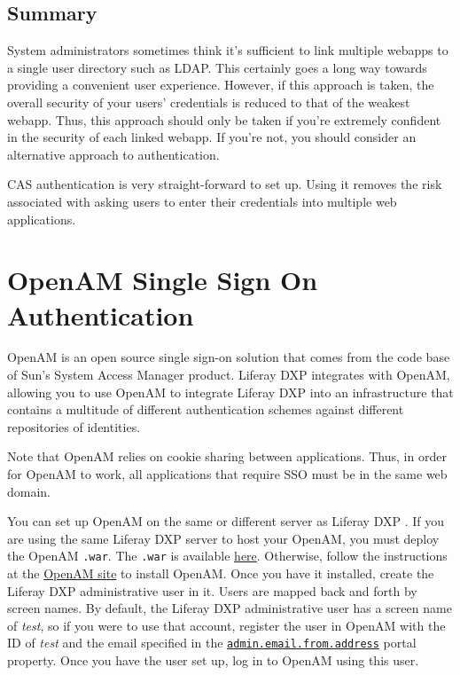 \subsection{Summary}\label{summary-3}

System administrators sometimes think it's sufficient to link multiple
webapps to a single user directory such as LDAP. This certainly goes a
long way towards providing a convenient user experience. However, if
this approach is taken, the overall security of your users' credentials
is reduced to that of the weakest webapp. Thus, this approach should
only be taken if you're extremely confident in the security of each
linked webapp. If you're not, you should consider an alternative
approach to authentication.

CAS authentication is very straight-forward to set up. Using it removes
the risk associated with asking users to enter their credentials into
multiple web applications.

\section{OpenAM Single Sign On
Authentication}\label{openam-single-sign-on-authentication}

OpenAM is an open source single sign-on solution that comes from the
code base of Sun's System Access Manager product. Liferay DXP integrates
with OpenAM, allowing you to use OpenAM to integrate Liferay DXP into an
infrastructure that contains a multitude of different authentication
schemes against different repositories of identities.

Note that OpenAM relies on cookie sharing between applications. Thus, in
order for OpenAM to work, all applications that require SSO must be in
the same web domain.

You can set up OpenAM on the same or different server as Liferay DXP .
If you are using the same Liferay DXP server to host your OpenAM, you
must deploy the OpenAM \texttt{.war}. The \texttt{.war} is available
\href{https://www.forgerock.com/platform/access-management/}{here}.
Otherwise, follow the instructions at the
\href{https://backstage.forgerock.com/docs/openam/12.0.4/install-guide}{OpenAM
site} to install OpenAM. Once you have it installed, create the Liferay
DXP administrative user in it. Users are mapped back and forth by screen
names. By default, the Liferay DXP administrative user has a screen name
of \emph{test}, so if you were to use that account, register the user in
OpenAM with the ID of \emph{test} and the email specified in the
\href{@platform-ref@/7.0-latest/propertiesdoc/portal.properties.html\#Admin\%20Portlet}{\texttt{admin.email.from.address}}
portal property. Once you have the user set up, log in to OpenAM using
this user.

